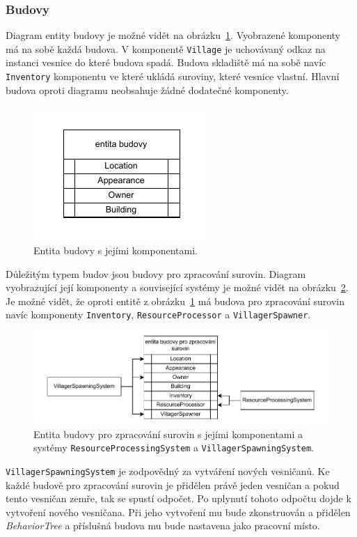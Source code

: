 \subsubsection{Budovy}
Diagram entity budovy je možné vidět na obrázku~\ref{fig:building}. Vyobrazené komponenty má na sobě každá budova. V komponentě \texttt{Village} je uchovávaný odkaz na instanci vesnice do které budova spadá. Budova skladiště má na sobě navíc \texttt{Inventory} komponentu ve které ukládá suroviny, které vesnice vlastní. Hlavní budova oproti diagramu neobsahuje žádné dodatečné komponenty.

\begin{figure}[!htb]
  \centering
  \includegraphics[width=0.4\linewidth]{img/building.pdf}
  \caption{Entita budovy s jejími komponentami.}
  \label{fig:building}
\end{figure}

Důležitým typem budov jsou budovy pro zpracování surovin. Diagram vyobrazující její komponenty a související systémy je možné vidět na obrázku~\ref{fig:res_building}. Je možné vidět, že oproti entitě z obrázku~\ref{fig:building} má budova pro zpracování surovin navíc komponenty \texttt{Inventory}, \texttt{ResourceProcessor} a \texttt{VillagerSpawner}.

\begin{figure}[!htb]
  \centering
  \includegraphics[width=1.0\linewidth]{img/resource_building.pdf}
  \caption{Entita budovy pro zpracování surovin s jejími komponentami a systémy \texttt{ResourceProcessingSystem} a \texttt{VillagerSpawningSystem}.}
  \label{fig:res_building}
\end{figure}

\texttt{VillagerSpawningSystem} je zodpovědný za vytváření nových vesničanů. Ke každé budově pro zpracování surovin je přidělen právě jeden vesničan a pokud tento vesničan zemře, tak se spustí odpočet. Po uplynutí tohoto odpočtu dojde k vytvoření nového vesničana. Při jeho vytvoření mu bude zkonstruován a přidělen \textit{BehaviorTree} a příslušná budova mu bude nastavena jako pracovní místo.

